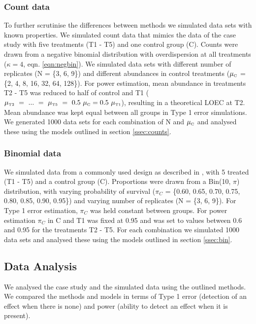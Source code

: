 \documentclass[twocolumn, natbib]{svjour3}
\begin{document}
\subsubsection{Count data}
To further scrutinise the differences between methods we simulated data sets with known properties.
We simulated count data that mimics the data of the case study with five treatments (T1 - T5) and one control group (C).
Counts were drawn from a negative binomial distribution with overdispersion at all treatments ($\kappa = 4$, eqn. \ref{eqn:negbin}).
We simulated data sets with different number of replicates (N = \{3, 6, 9\}) and different abundances in control treatments ($\mu_\text{\tiny C}$ = \{2, 4, 8, 16, 32, 64, 128\}). 
For power estimation, mean abundance in treatments T2 - T5 was reduced to half of control and T1 ($\mu_\text{\tiny T2}~=~...~=~\mu_\text{\tiny T5}~=~0.5~\mu_\text{\tiny C} = 0.5~\mu_\text{\tiny T1}$), resulting in a theoretical LOEC at T2.
Mean abundance was kept equal between all groups in Type 1 error simulations.
We generated 1000 data sets for each combination of N and $\mu_\text{\tiny C}$ and analysed these using the models outlined in section \ref{ssec:counts}.


\subsubsection{Binomial data}
We simulated data from a commonly used design as described in \citet{weber_short-term_1989}, with 5 treated (T1 - T5) and a control group (C). 
Proportions were drawn from a Bin(10, $\pi$) distribution, with varying probability of survival ($\pi_C$ = \{0.60, 0.65, 0.70, 0.75, 0.80, 0.85, 0.90, 0.95\}) and varying number of replicates (N = \{3, 6, 9\}).
For Type 1 error estimation, $\pi_C$ was held constant between groups.
For power estimation $\pi_C$ in C and T1 was fixed at 0.95 and was set to values between 0.6 and 0.95 for the treatments T2 - T5. 
For each combination we simulated 1000 data sets and analysed these using the models outlined in section \ref{ssec:bin}.

\subsection{Data Analysis}
We analysed the case study and the simulated data using the outlined methods.
We compared the methods and models in terms of Type 1 error (detection of an effect when there is none) and power (ability to detect an effect when it is present).
\end{document}

